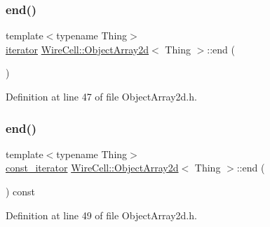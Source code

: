 \subsubsection{\texorpdfstring{end()}{end()}\hspace{0.1cm}{\footnotesize\ttfamily [1/2]}}
{\footnotesize\ttfamily template$<$typename Thing$>$ \\
\hyperlink{class_wire_cell_1_1_object_array2d_a08055a2eb80a3d4de9dcd72e5da07227}{iterator} \hyperlink{class_wire_cell_1_1_object_array2d}{Wire\+Cell\+::\+Object\+Array2d}$<$ Thing $>$\+::end (\begin{DoxyParamCaption}{ }\end{DoxyParamCaption})\hspace{0.3cm}{\ttfamily [inline]}}



Definition at line 47 of file Object\+Array2d.\+h.

\mbox{\label{class_wire_cell_1_1_object_array2d_aa3ceab62503002c04e43319935added5}} 
\subsubsection{\texorpdfstring{end()}{end()}\hspace{0.1cm}{\footnotesize\ttfamily [2/2]}}
{\footnotesize\ttfamily template$<$typename Thing$>$ \\
\hyperlink{class_wire_cell_1_1_object_array2d_a4ac09025b41a1ab92f472eeae2cc0352}{const\+\_\+iterator} \hyperlink{class_wire_cell_1_1_object_array2d}{Wire\+Cell\+::\+Object\+Array2d}$<$ Thing $>$\+::end (\begin{DoxyParamCaption}{ }\end{DoxyParamCaption}) const\hspace{0.3cm}{\ttfamily [inline]}}



Definition at line 49 of file Object\+Array2d.\+h.

\mbox{\label{class_wire_cell_1_1_object_array2d_ab0f19f4fa69292149a91b8d735896a0a}} 
